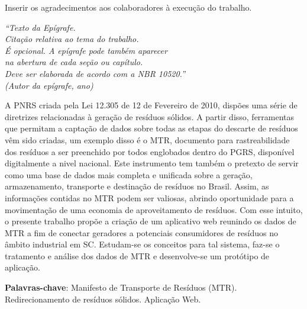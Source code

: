 
\begin{agradecimentos}
	Inserir os agradecimentos aos colaboradores à execução do trabalho. 
	
\end{agradecimentos}

\begin{epigrafe}
	\vspace*{\fill}
	\begin{flushright}
		\textit{``Texto da Epígrafe.\\
			Citação relativa ao tema do trabalho.\\
			É opcional. A epígrafe pode também aparecer\\
			na abertura de cada seção ou capítulo.\\
			Deve ser elaborada de acordo com a NBR 10520.''\\
			(Autor da epígrafe, ano)}
	\end{flushright}
\end{epigrafe}


\setlength{\absparsep}{18pt} %
\begin{resumo}
	\SingleSpacing

	A \gls{PNRS} criada pela Lei 12.305 de 12
	de Fevereiro de 2010, dispões uma série de diretrizes relacionadas à geração de resíduos sólidos. A partir disso, ferramentas que permitam a captação de dados sobre todas as etapas do descarte de resíduos vêm sido criadas, um exemplo disso é o \gls{MTR}, documento para rastreabilidade dos resíduos a ser preenchido por todos englobados dentro do \gls{PGRS}, disponível digitalmente a nivel nacional. Este instrumento tem também o pretexto de servir como uma base de dados mais completa e unificada sobre a geração, armazenamento, transporte e destinação de resíduos no Brasil. Assim, as informações contidas no \gls{MTR} podem ser valiosas, abrindo oportunidade para a movimentação de uma economia de aproveitamento de resíduos. Com esse intuito, o presente trabalho propõe a criação de um aplicativo web reunindo os dados de \gls{MTR} a fim de conectar geradores a potenciais consumidores de resíduos no âmbito industrial em \gls{SC}. Estudam-se os conceitos para tal sistema, faz-se o tratamento e análise dos dados de \gls{MTR} e desenvolve-se um protótipo de aplicação.
	
	\textbf{Palavras-chave}: Manifesto de Transporte de Resíduos (MTR). Redirecionamento de resíduos sólidos. Aplicação Web.
\end{resumo}

